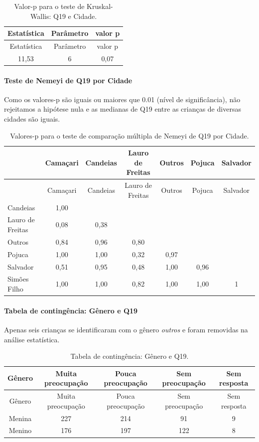 \documentclass[]{article}
\let\oldparagraph\paragraph
\renewcommand{\paragraph}[1]{\oldparagraph{#1}\mbox{}}
\begin{document}
\begin{longtable}[]{@{}ccc@{}}
\caption{\label{tab:unnamed-chunk-314}Valor-p para o teste de Kruskal-Wallis: Q19 e Cidade.}\tabularnewline
\toprule
Estatística & Parâmetro & valor p\tabularnewline
\midrule
\endfirsthead
\toprule
Estatística & Parâmetro & valor p\tabularnewline
\midrule
\endhead
11,53 & 6 & 0,07\tabularnewline
\bottomrule
\end{longtable}

\hypertarget{teste-de-nemeyi-de-q19-por-cidade}{%
\paragraph{Teste de Nemeyi de Q19 por Cidade}\label{teste-de-nemeyi-de-q19-por-cidade}}

Como os valores-p são iguais ou maiores que 0.01 (nível de significância), não rejeitamos a hipótese nula e as medianas de Q19 entre as crianças de diversas cidades são iguais.

\begin{longtable}[]{@{}lcccccc@{}}
\caption{\label{tab:unnamed-chunk-316}Valores-p para o teste de comparação múltipla de Nemeyi de Q19 por Cidade.}\tabularnewline
\toprule
& Camaçari & Candeias & Lauro de Freitas & Outros & Pojuca & Salvador\tabularnewline
\midrule
\endfirsthead
\toprule
& Camaçari & Candeias & Lauro de Freitas & Outros & Pojuca & Salvador\tabularnewline
\midrule
\endhead
Candeias & 1,00 & & & & &\tabularnewline
Lauro de Freitas & 0,08 & 0,38 & & & &\tabularnewline
Outros & 0,84 & 0,96 & 0,80 & & &\tabularnewline
Pojuca & 1,00 & 1,00 & 0,32 & 0,97 & &\tabularnewline
Salvador & 0,51 & 0,95 & 0,48 & 1,00 & 0,96 &\tabularnewline
Simões Filho & 1,00 & 1,00 & 0,82 & 1,00 & 1,00 & 1\tabularnewline
\bottomrule
\end{longtable}

\cleardoublepage

\hypertarget{tabela-de-continguxeancia-guxeanero-e-q19}{%
\paragraph{Tabela de contingência: Gênero e Q19}\label{tabela-de-continguxeancia-guxeanero-e-q19}}

Apenas seis crianças se identificaram com o gênero \emph{outros} e foram removidas na análise estatística.

\begin{longtable}[]{@{}ccccc@{}}
\caption{\label{tab:unnamed-chunk-317}Tabela de contingência: Gênero e Q19.}\tabularnewline
\toprule
Gênero & Muita preocupação & Pouca preocupação & Sem preocupação & Sem resposta\tabularnewline
\midrule
\endfirsthead
\toprule
Gênero & Muita preocupação & Pouca preocupação & Sem preocupação & Sem resposta\tabularnewline
\midrule
\endhead
Menina & 227 & 214 & 91 & 9\tabularnewline
Menino & 176 & 197 & 122 & 8\tabularnewline
\bottomrule
\end{longtable}
\end{document}
